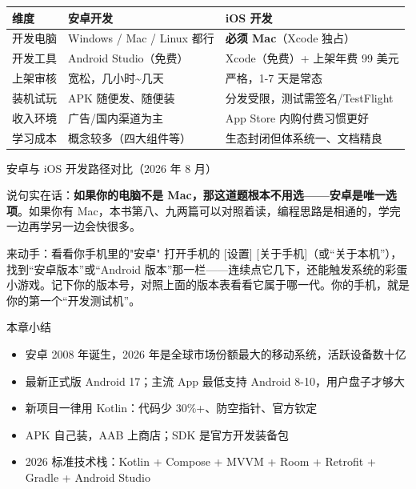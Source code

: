 \begin{center}
\begin{tabularx}{\linewidth}{|X|X|X|}
\hline
\textbf{维度} & \textbf{安卓开发} & \textbf{iOS 开发} \tabularnewline
\hline
开发电脑 & Windows / Mac / Linux 都行 & \textbf{必须 Mac}（Xcode 独占） \tabularnewline
开发工具 & Android Studio（免费） & Xcode（免费）+ 上架年费 99 美元 \tabularnewline
上架审核 & 宽松，几小时\textasciitilde{}几天 & 严格，1-7 天是常态 \tabularnewline
装机试玩 & APK 随便发、随便装 & 分发受限，测试需签名/TestFlight \tabularnewline
收入环境 & 广告/国内渠道为主 & App Store 内购付费习惯更好 \tabularnewline
学习成本 & 概念较多（四大组件等） & 生态封闭但体系统一、文档精良 \tabularnewline
\hline
\end{tabularx}
\end{center}

\begin{center}\small\color{gray}安卓与 iOS 开发路径对比（2026 年 8 月）\end{center}

说句实在话：\textbf{如果你的电脑不是 Mac，那这道题根本不用选——安卓是唯一选项}。如果你有 Mac，本书第八、九两篇可以对照着读，编程思路是相通的，学完一边再学另一边会快很多。

\begin{tcbpractice}{来动手：看看你手机里的"安卓"}
打开手机的 [设置] [关于手机]（或“关于本机”），找到“安卓版本”或“Android 版本”那一栏——连续点它几下，还能触发系统的彩蛋小游戏。记下你的版本号，对照上面的版本表看看它属于哪一代。你的手机，就是你的第一个“开发测试机”。

\end{tcbpractice}

\begin{tcbsummary}{本章小结}
\begin{itemize}
  \item 安卓 2008 年诞生，2026 年是全球市场份额最大的移动系统，活跃设备数十亿
  \item 最新正式版 Android 17；主流 App 最低支持 Android 8-10，用户盘子才够大
  \item 新项目一律用 Kotlin：代码少 30\%+、防空指针、官方钦定
  \item APK 自己装，AAB 上商店；SDK 是官方开发装备包
  \item 2026 标准技术栈：Kotlin + Compose + MVVM + Room + Retrofit + Gradle + Android Studio
\end{itemize}

\end{tcbsummary}
